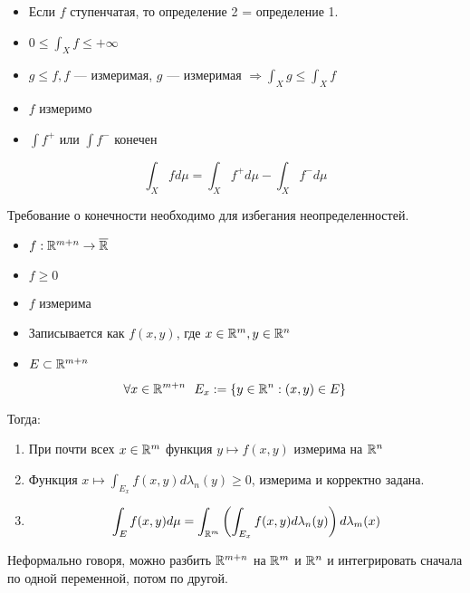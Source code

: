 \begin{prop}\itemfix
    \begin{itemize}
        \item Если \(f\) ступенчатая, то определение 2 = определение 1.
        \item \(0 \leq \int_X f \leq +\infty\)
        \item \(g \leq f, f\) --- измеримая, \(g\) --- измеримая \( \Rightarrow \int_X g \leq \int_X f\)
    \end{itemize}
\end{prop}

\begin{definition}[3]\itemfix
    \begin{itemize}
        \item \(f\) измеримо
        \item \(\int f^{+}\) или \(\int f^{-}\) конечен
    \end{itemize}

    \[\int_X f d\mu = \int_X f^{+} d\mu - \int_X f^{-} d\mu\]

    Требование о конечности необходимо для избегания неопределенностей.
\end{definition}

\begin{theorem}[Тонелли]\itemfix
    \begin{itemize}
        \item \(f : \mathbb{R}^{m + n} \to \overline {\mathbb{R}}\)
        \item \(f \geq 0\)
        \item \(f\) измерима
        \item Записывается как \(f(x, y)\), где \(x\in\mathbb{R}^m, y\in\mathbb{R}^n\)
        \item \(E\subset \mathbb{R}^{m + n}\)
    \end{itemize}

    \begin{obozn}
        \[\forall x\in\mathbb{R}^{m + n} \ \ E_x : = \{y\in\mathbb{R}^n : (x, y)\in E\} \]
    \end{obozn}

    Тогда:
    \begin{enumerate}
        \item При почти всех \(x\in \mathbb{R}^m\) функция \(y \mapsto f(x,y)\) измерима на \(\mathbb{R}^n\)
        \item Функция \(x \mapsto \int_{E_x} f(x, y) d\lambda_n(y) \geq 0\), измерима и корректно задана.
        \item \[\int_E f(x, y) d\mu = \int_{\mathbb{R}^m} \left( \int_{E_x} f(x, y) d\lambda_n(y) \right) d\lambda_m (x)\]
    \end{enumerate}
\end{theorem}

\begin{remark}
    Неформально говоря, можно разбить \(\mathbb{R}^{m + n}\) на \(\mathbb{R}^{m}\) и \(\mathbb{R}^n\) и интегрировать сначала по одной переменной, потом по другой.
\end{remark}

